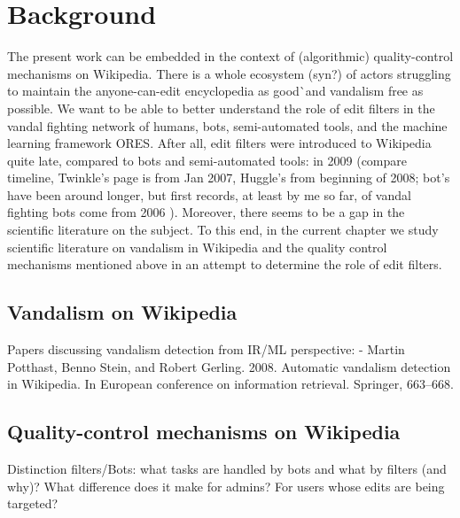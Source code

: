 \chapter{Background}
\label{chap:background}

The present work can be embedded in the context of (algorithmic) quality-control mechanisms on Wikipedia.
There is a whole ecosystem (syn?) of actors struggling to maintain the anyone-can-edit encyclopedia as good^^ and vandalism free as possible.
We want to be able to better understand the role of edit filters in the vandal fighting network of humans, bots, semi-automated tools, and the machine learning framework ORES.
After all, edit filters were introduced to Wikipedia quite late, compared to bots and semi-automated tools: in 2009 (compare timeline, Twinkle's page is from Jan 2007, Huggle's from beginning of 2008; bot's have been around longer, but first records, at least by me so far, of vandal fighting bots come from 2006 ). %
Moreover, there seems to be a gap in the scientific literature on the subject.
To this end, in the current chapter we study scientific literature on vandalism in Wikipedia and the quality control mechanisms mentioned above in an attempt to determine the role of edit filters.

\section{Vandalism on Wikipedia}

Papers discussing vandalism detection from IR/ML perspective:
- Martin Potthast, Benno Stein, and Robert Gerling. 2008. Automatic vandalism detection in Wikipedia. In European conference on information retrieval. Springer, 663–668.

\section{Quality-control mechanisms on Wikipedia}


Distinction filters/Bots: what tasks are handled by bots and what by filters (and why)? What difference does it make for admins? For users whose edits are being targeted? %

